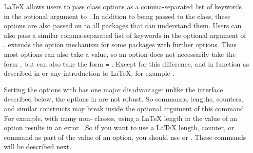 \begin{Declaration}
\end{Declaration}
\LaTeX{} allows users to pass class options as a
comma-separated list of keywords in the optional argument to
. In addition to being passed to the class, these options
are also passed on to all packages that can
understand them. Users can also pass a similar comma-separated list of
keywords in the optional argument of . \KOMAScript{} extends the option mechanism for
 some packages with further options. Thus most \KOMAScript{} options can also
take a value, so an option does not necessarily take the form ,
but can also take the form \texttt{=}%
. Except for this difference,
 and  in \KOMAScript{} function as
described in \cite{latex:usrguide} or any introduction to \LaTeX, for example
\cite{lshort}.


Setting the options with  has one
major disadvantage: unlike the interface described below, the options in 
 are not robust. So commands, lengths, counters, and
similar constructs may break inside the optional argument of this command.
For example, with many non-\KOMAScript{} classes, using a \LaTeX{} length
in the value of an option results in an error%
%
. So if you want to use a \LaTeX{} length, counter, or command as part of the
value of an option, you should use  or
. These commands will be described next.%
%
\EndIndexGroup


